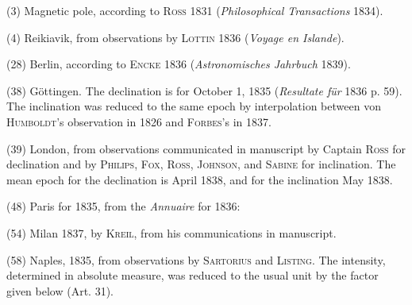 (3) Magnetic pole, according to \textsc{Ross} 1831 (\textit{Philosophical Transactions} 1834).

(4) Reikiavik, from observations by \textsc{Lottin} 1836 (\textit{Voyage en Islande}).

(28) Berlin, according to \textsc{Encke} 1836 (\textit{Astronomisches Jahrbuch} 1839).

(38) Göttingen. The declination is for October 1, 1835 (\textit{Resultate für} 1836 p. 59). The inclination was reduced to the same epoch by interpolation between von \textsc{Humboldt}'s observation in 1826 and \textsc{Forbes}'s in 1837.

(39) London, from observations communicated in manuscript by Captain \textsc{Ross} for declination and by \textsc{Philips}, \textsc{Fox}, \textsc{Ross}, \textsc{Johnson}, and \textsc{Sabine} for inclination. The mean epoch for the declination is April 1838, and for the inclination May 1838.

(48) Paris for 1835, from the \textit{Annuaire} for 1836:

(54) Milan 1837, by \textsc{Kreil}, from his communications in manuscript.

(58) Naples, 1835, from observations by \textsc{Sartorius} and \textsc{Listing}. The intensity, determined in absolute measure, was reduced to the usual unit by the factor given below (Art. 31).

